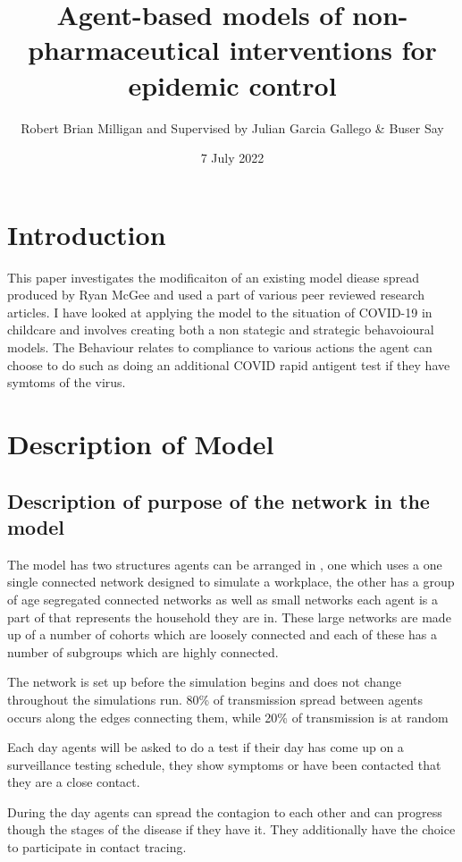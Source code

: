 \documentclass{article}
\title{Agent-based models of non-pharmaceutical interventions for epidemic control}
\author{Robert Brian Milligan and Supervised by Julian Garcia Gallego \& Buser Say}
\date{7 July 2022}
\begin{document}
\tableofcontents

\maketitle

\section{Introduction}
This paper investigates the modificaiton of an existing model diease spread produced by Ryan McGee and used a part of various peer reviewed research articles. I have looked at applying the model to the situation of COVID-19 in childcare and involves creating both a non stategic and strategic behavoioural models. The Behaviour relates to compliance to various actions the agent can choose to do such as doing an additional COVID rapid antigent test if they have symtoms of the virus.

\section{Description of Model}
\subsection{Description of purpose of the network in the model}
The model has two structures agents can be arranged in , one which uses a one single connected network designed to simulate a workplace, the other has a group of age segregated connected networks as well as small networks each agent is a part of that represents the household they are in. These large networks are made up of a number of cohorts which are loosely connected and each of these has a number of subgroups which are highly connected.

The network is set up before the simulation begins and does not change throughout the simulations run. 80\% of transmission spread between agents occurs along the edges connecting them, while 20\% of transmission is at  random

Each day agents will be asked to do a test if their day has come up on a surveillance testing schedule, they show symptoms or have been contacted that they are a close contact.

During the day agents can spread the contagion to each other and can progress though the stages of the disease if they have it. They additionally have the choice to participate in contact tracing.
\end{document}
